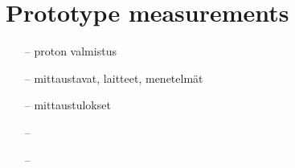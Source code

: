 \section{Prototype measurements}
\begin{itemize}
\item[--]proton valmistus
\item[--]mittaustavat, laitteet, menetelmät
\item[--]mittaustulokset
\item[--]
\item[--]
\end{itemize}

\clearpage